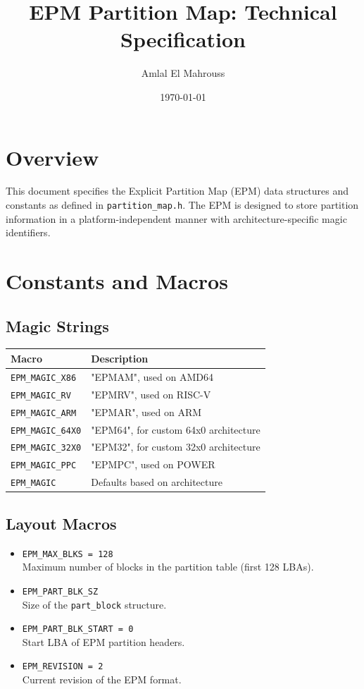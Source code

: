 \documentclass[12pt]{article}
\title{EPM Partition Map: Technical Specification}
\author{Amlal El Mahrouss}
\date{\today}
\begin{document}
\maketitle

\section{Overview}
This document specifies the Explicit Partition Map (EPM) data structures and constants as defined in \texttt{partition\_map.h}. The EPM is designed to store partition information in a platform-independent manner with architecture-specific magic identifiers.

\section{Constants and Macros}

\subsection{Magic Strings}
\begin{longtable}{|l|l|}
\hline
\textbf{Macro} & \textbf{Description} \\
\hline
\texttt{EPM\_MAGIC\_X86} & "EPMAM", used on AMD64 \\
\texttt{EPM\_MAGIC\_RV} & "EPMRV", used on RISC-V \\
\texttt{EPM\_MAGIC\_ARM} & "EPMAR", used on ARM \\
\texttt{EPM\_MAGIC\_64X0} & "EPM64", for custom 64x0 architecture \\
\texttt{EPM\_MAGIC\_32X0} & "EPM32", for custom 32x0 architecture \\
\texttt{EPM\_MAGIC\_PPC} & "EPMPC", used on POWER \\
\texttt{EPM\_MAGIC} & Defaults based on architecture \\
\hline
\end{longtable}

\subsection{Layout Macros}
\begin{itemize}
  \item \texttt{EPM\_MAX\_BLKS = 128} \\
  Maximum number of blocks in the partition table (first 128 LBAs).
  \item \texttt{EPM\_PART\_BLK\_SZ} \\
  Size of the \texttt{part\_block} structure.
  \item \texttt{EPM\_PART\_BLK\_START = 0} \\
  Start LBA of EPM partition headers.
  \item \texttt{EPM\_REVISION = 2} \\
  Current revision of the EPM format.
\end{itemize}
\end{document}
